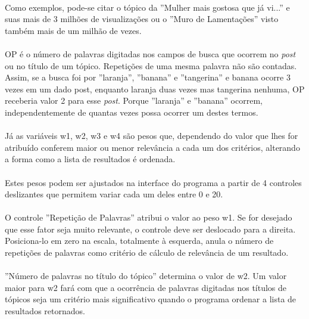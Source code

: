 \documentclass[a4paper,12pt,openany]{book}
\begin{document}
\paragraph{}
Como exemplos, pode-se citar o tópico da ”Mulher mais gostosa que já vi...” e suas mais de 3 milhões de visualizações ou o ”Muro de Lamentações” visto também mais de um milhão de vezes.
\paragraph{}
OP é o número de palavras digitadas nos campos de busca que ocorrem no \textit{post} ou no título de um tópico. Repetições de uma mesma palavra não são contadas. Assim, se a busca foi por ”laranja”, ”banana” e ”tangerina” e banana ocorre 3 vezes em um dado post, enquanto laranja duas vezes mas tangerina nenhuma, OP receberia valor 2 para esse \textit{post}. Porque ”laranja” e ”banana” ocorrem, independentemente de quantas vezes possa ocorrer um destes termos.
\paragraph{}
Já as variáveis w1, w2, w3 e w4 são pesos que, dependendo do valor que lhes for atribuído conferem maior ou menor relevância a cada um dos critérios, alterando a forma como a lista de resultados é ordenada.
\paragraph{}
Estes pesos podem ser ajustados na interface do programa a partir de 4 controles deslizantes que permitem variar cada um deles entre 0 e 20.
\paragraph{}
O controle ”Repetição de Palavras” atribui o valor ao peso w1. Se for desejado que esse fator seja muito relevante, o controle deve ser deslocado para a direita. Posiciona-lo em zero na escala, totalmente à esquerda, anula o número de repetições de palavras como critério de cálculo de relevância de um resultado.
\paragraph{}
”Número de palavras no título do tópico” determina o valor de w2. Um valor maior para w2 fará com que a ocorrência de palavras digitadas nos títulos de tópicos seja um critério mais significativo quando o programa ordenar a lista de resultados retornados.
\end{document}
